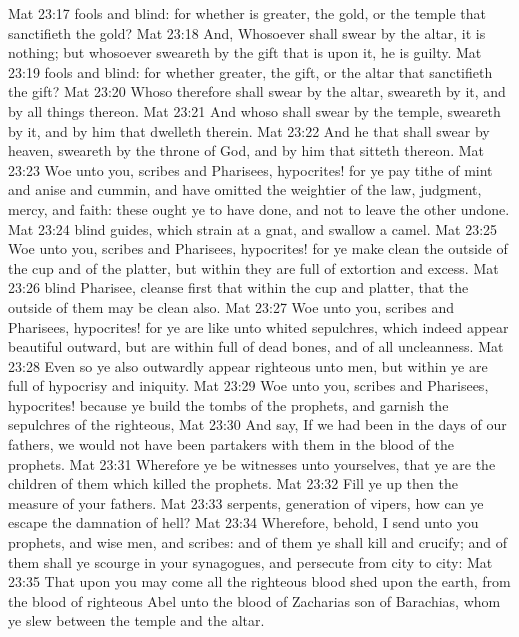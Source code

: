 \vs Mat 23:17  fools and blind: for whether is greater, the gold, or the temple that sanctifieth the gold?
\vs Mat 23:18 And, Whosoever shall swear by the altar, it is nothing; but whosoever sweareth by the gift that is upon it, he is guilty.
\vs Mat 23:19  fools and blind: for whether  greater, the gift, or the altar that sanctifieth the gift?
\vs Mat 23:20 Whoso therefore shall swear by the altar, sweareth by it, and by all things thereon.
\vs Mat 23:21 And whoso shall swear by the temple, sweareth by it, and by him that dwelleth therein.
\vs Mat 23:22 And he that shall swear by heaven, sweareth by the throne of God, and by him that sitteth thereon.
\vs Mat 23:23 Woe unto you, scribes and Pharisees, hypocrites! for ye pay tithe of mint and anise and cummin, and have omitted the weightier  of the law, judgment, mercy, and faith: these ought ye to have done, and not to leave the other undone.
\vs Mat 23:24  blind guides, which strain at a gnat, and swallow a camel.
\vs Mat 23:25 Woe unto you, scribes and Pharisees, hypocrites! for ye make clean the outside of the cup and of the platter, but within they are full of extortion and excess.
\vs Mat 23:26  blind Pharisee, cleanse first that  within the cup and platter, that the outside of them may be clean also.
\vs Mat 23:27 Woe unto you, scribes and Pharisees, hypocrites! for ye are like unto whited sepulchres, which indeed appear beautiful outward, but are within full of dead  bones, and of all uncleanness.
\vs Mat 23:28 Even so ye also outwardly appear righteous unto men, but within ye are full of hypocrisy and iniquity.
\vs Mat 23:29 Woe unto you, scribes and Pharisees, hypocrites! because ye build the tombs of the prophets, and garnish the sepulchres of the righteous,
\vs Mat 23:30 And say, If we had been in the days of our fathers, we would not have been partakers with them in the blood of the prophets.
\vs Mat 23:31 Wherefore ye be witnesses unto yourselves, that ye are the children of them which killed the prophets.
\vs Mat 23:32 Fill ye up then the measure of your fathers.
\vs Mat 23:33  serpents,  generation of vipers, how can ye escape the damnation of hell?
\vs Mat 23:34 Wherefore, behold, I send unto you prophets, and wise men, and scribes: and  of them ye shall kill and crucify; and  of them shall ye scourge in your synagogues, and persecute  from city to city:
\vs Mat 23:35 That upon you may come all the righteous blood shed upon the earth, from the blood of righteous Abel unto the blood of Zacharias son of Barachias, whom ye slew between the temple and the altar.
